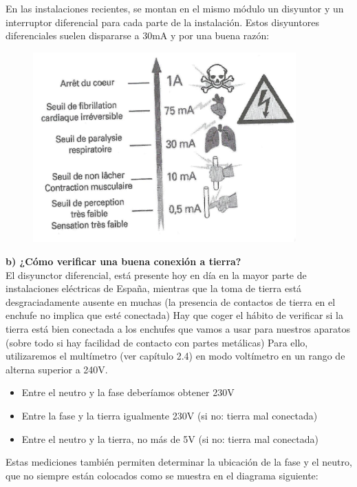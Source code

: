\documentclass[a5paper,twoside,openany]{book}
\begin{document}
En las instalaciones recientes, se montan en el mismo módulo un disyuntor y un interruptor diferencial para cada parte de la instalación. Estos disyuntores diferenciales suelen dispararse a 30mA y por una buena razón:

\begin{figure}[h]
\includegraphics[width=0.9\textwidth]{corriente-efectos} 
\centering
\end{figure}

\textbf{b) ¿Cómo verificar una buena conexión a tierra?}\\
El disyunctor diferencial, está presente hoy en día en la mayor parte de instalaciones eléctricas de España, mientras que la toma de tierra está desgraciadamente ausente en muchas (la presencia de contactos de tierra en el enchufe no implica que esté conectada) Hay que coger el hábito de verificar si la tierra está bien conectada a los enchufes que vamos a usar para nuestros aparatos (sobre todo si hay facilidad de contacto con partes metálicas) Para ello, utilizaremos el multímetro (ver capítulo 2.4) en modo voltímetro en un rango de alterna superior a 240V.
\begin{itemize}
\item Entre el neutro y la fase deberíamos obtener 230V
\item Entre la fase y la tierra igualmente 230V (si no: tierra mal conectada)
\item Entre el neutro y la tierra, no más de 5V (si no: tierra mal conectada)
\end{itemize}
\newpage

Estas mediciones también permiten determinar la ubicación de la fase y el neutro, que no siempre están colocados como se muestra en el diagrama siguiente:
\end{document}

